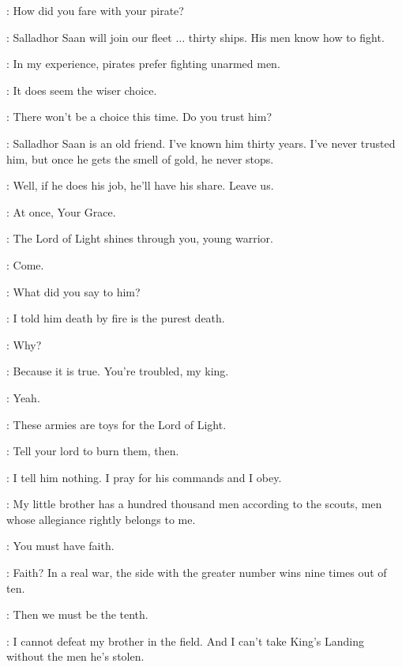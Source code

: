 \STANNIS: How did you fare with your pirate?

\DAVOS: Salladhor Saan will join our fleet $\ldots$ thirty ships. His men know how to fight.

\STANNIS: In my experience, pirates prefer fighting unarmed men.

\DAVOS: It does seem the wiser choice.

\STANNIS: There won't be a choice this time. Do you trust him?

\DAVOS: Salladhor Saan is an old friend. I've known him thirty years. I've never trusted him, but once he gets the smell of gold, he never stops.

\STANNIS: Well, if he does his job, he'll have his share. Leave us.

\DAVOS: At once, Your Grace.


\MELISANDRE: The Lord of Light shines through you, young warrior.


\DAVOS: Come.

\STANNIS: What did you say to him?

\MELISANDRE: I told him death by fire is the purest death.

\STANNIS: Why?

\MELISANDRE: Because it is true. You're troubled, my king.

\STANNIS: Yeah.

\MELISANDRE: These armies are toys for the Lord of Light.

\STANNIS: Tell your lord to burn them, then.

\MELISANDRE: I tell him nothing. I pray for his commands and I obey.

\STANNIS: My little brother has a hundred thousand men according to the scouts, men whose allegiance rightly belongs to me.

\MELISANDRE: You must have faith.

\STANNIS: Faith? In a real war, the side with the greater number wins nine times out of ten.

\MELISANDRE: Then we must be the tenth.

\STANNIS: I cannot defeat my brother in the field. And I can't take King's Landing without the men he's stolen.

